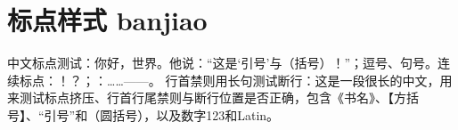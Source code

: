 \documentclass[a4paper,10pt,UTF8,scheme=chinese]{ctexart}
\begin{document}
\section{标点样式 banjiao}
中文标点测试：你好，世界。他说：“这是‘引号’与（括号）！”；逗号、句号。连续标点：！？；：……——。
行首禁则用长句测试断行：这是一段很长的中文，用来测试标点挤压、行首行尾禁则与断行位置是否正确，包含《书名》、【方括号】、“引号”和（圆括号），以及数字123和Latin。
\end{document}
